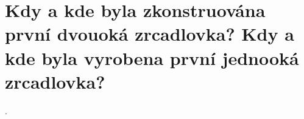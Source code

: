 \section{Kdy a kde byla zkonstruována první dvouoká zrcadlovka? Kdy a kde byla vyrobena první jednooká zrcadlovka?}.